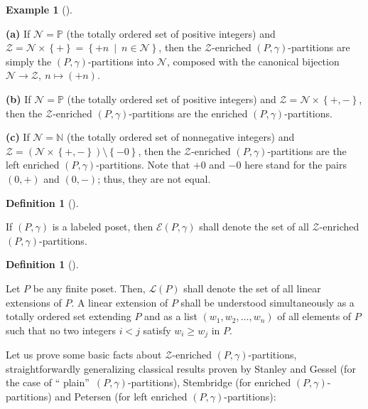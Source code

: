 \documentclass[numbers=enddot,12pt,final,onecolumn,notitlepage]{scrartcl}%
\theoremstyle{definition}
\newtheorem{defi}[theo]{Definition}
\newenvironment{definition}[1][]
{\begin{defi}[#1]\begin{leftbar}}
{\end{leftbar}\end{defi}}
\newtheorem{exmp}[theo]{Example}
\newenvironment{example}[1][]
{\begin{exmp}[#1]\begin{leftbar}}
{\end{leftbar}\end{exmp}}
\begin{document}
\begin{example}
\label{exa.ambivPp.abc}\textbf{(a)} If $\mathcal{N}=\mathbb{P}$ (the totally
ordered set of positive integers) and $\mathcal{Z}=\mathcal{N}\times\left\{
+\right\}  =\left\{  +n\ \mid\ n\in\mathcal{N}\right\}  $, then the
$\mathcal{Z}$-enriched $\left(  P,\gamma\right)  $-partitions are simply the
$\left(  P,\gamma\right)  $-partitions into $\mathcal{N}$, composed with the
canonical bijection $\mathcal{N}\rightarrow\mathcal{Z},\ n\mapsto\left(
+n\right)  $.

\textbf{(b)} If $\mathcal{N}=\mathbb{P}$ (the totally ordered set of positive
integers) and $\mathcal{Z}=\mathcal{N}\times\left\{  +,-\right\}  $, then the
$\mathcal{Z}$-enriched $\left(  P,\gamma\right)  $-partitions are the enriched
$\left(  P,\gamma\right)  $-partitions.

\textbf{(c)} If $\mathcal{N}=\mathbb{N}$ (the totally ordered set of
nonnegative integers) and $\mathcal{Z}=\left(  \mathcal{N}\times\left\{
+,-\right\}  \right)  \setminus\left\{  -0\right\}  $, then the $\mathcal{Z}%
$-enriched $\left(  P,\gamma\right)  $-partitions are the left enriched
$\left(  P,\gamma\right)  $-partitions. Note that $+0$ and $-0$ here stand for
the pairs $\left(  0,+\right)  $ and $\left(  0,-\right)  $; thus, they are
not equal.
\end{example}

\begin{definition}
If $\left(  P,\gamma\right)  $ is a labeled poset, then $\mathcal{E}\left(
P,\gamma\right)  $ shall denote the set of all $\mathcal{Z}$-enriched $\left(
P,\gamma\right)  $-partitions.
\end{definition}

\begin{definition}
Let $P$ be any finite poset. Then, $\mathcal{L}\left(  P\right)  $ shall
denote the set of all linear extensions of $P$. A linear extension of $P$
shall be understood simultaneously as a totally ordered set extending $P$ and
as a list $\left(  w_{1},w_{2},\ldots,w_{n}\right)  $ of all elements of $P$
such that no two integers $i<j$ satisfy $w_{i}\geq w_{j}$ in $P$.
\end{definition}

Let us prove some basic facts about $\mathcal{Z}$-enriched $\left(
P,\gamma\right)  $-partitions, straightforwardly generalizing classical
results proven by Stanley and Gessel (for the case of \textquotedblleft
plain\textquotedblright\ $\left(  P,\gamma\right)  $-partitions), Stembridge
\cite[Lemma 2.1]{Stembr97}
(for enriched $\left(  P,\gamma\right)  $-partitions) and
Petersen \cite[Lemma 3.4.1]{Peters06} (for left
enriched $\left(  P,\gamma\right)  $-partitions):
\end{document}
